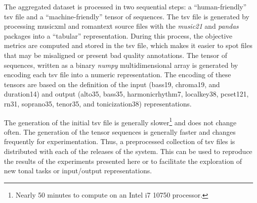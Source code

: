 
The aggregated dataset is processed in two sequential steps:
a ``human-friendly'' \gls{tsv} file and a
``machine-friendly'' tensor of sequences. The \gls{tsv} file
is generated by processing \gls{musicxml} and
\gls{romantext} source files with the \emph{music21}
\parencite{cuthbert2010music21} and \emph{pandas}
\parencite{mckinney2011pandas} packages into a ``tabular''
representation. During this process, the objective metrics
are computed and stored in the \gls{tsv} file, which makes
it easier to spot files that may be misaligned or present
bad quality annotations. The tensor of sequences, written as
a binary \emph{numpy} \parencite{oliphant2006guide}
multidimensional array is generated by encoding each
\gls{tsv} file into a numeric representation. The encoding
of these tensors are based on the definition of the input
(\gls{bass19}, \gls{chroma19}, and \gls{duration14}) and
output (\gls{alto35}, \gls{bass35}, \gls{harmonicrhythm7},
\gls{localkey38}, \gls{pcset121}, \gls{rn31},
\gls{soprano35}, \gls{tenor35}, and \gls{tonicization38})
representations.

The generation of the initial \gls{tsv} file is generally
slower\footnote{Nearly 50 minutes to compute on an Intel i7
10750 processor.} and does not change often. The generation
of the tensor sequences is generally faster and changes
frequently for experimentation. Thus, a preprocessed
collection of \gls{tsv} files is distributed with each of
the releases of the system. This can be used to reproduce
the results of the experiments presented here or to
facilitate the exploration of new tonal tasks or
input/output representations.
